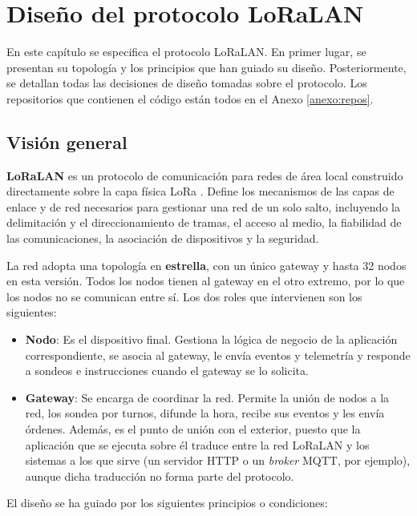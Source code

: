 \chapter{Diseño del protocolo LoRaLAN}\label{chap:4}

En este capítulo se especifica el protocolo LoRaLAN. En primer lugar, se presentan su topología y los principios que han guiado su diseño. Posteriormente, se detallan todas las decisiones de diseño tomadas sobre el protocolo. Los repositorios que contienen el código están todos en el Anexo \ref{anexo:repos}.


\section{Visión general}

\textbf{LoRaLAN} es un protocolo de comunicación para redes de área local construido directamente sobre la capa física LoRa \cite{semtech_sx1276}. Define los mecanismos de las capas de enlace y de red necesarios para gestionar una red de un solo salto, incluyendo la delimitación y el direccionamiento de tramas, el acceso al medio, la fiabilidad de las comunicaciones, la asociación de dispositivos y la seguridad.

La red adopta una topología en \textbf{estrella}, con un único gateway y hasta 32 nodos en esta versión. Todos los nodos tienen al gateway en el otro extremo, por lo que los nodos no se comunican entre sí. Los dos roles que intervienen son los siguientes:

\begin{itemize}
\item \textbf{Nodo}: Es el dispositivo final. Gestiona la lógica de negocio de la aplicación correspondiente, se asocia al gateway, le envía eventos y telemetría y responde a sondeos e instrucciones cuando el gateway se lo solicita.

\item \textbf{Gateway}: Se encarga de coordinar la red. Permite la unión de nodos a la red, los sondea por turnos, difunde la hora, recibe sus eventos y les envía órdenes. Además, es el punto de unión con el exterior, puesto que la aplicación que se ejecuta sobre él traduce entre la red LoRaLAN y los sistemas a los que sirve (un servidor HTTP o un \textit{broker} MQTT, por ejemplo), aunque dicha traducción no forma parte del protocolo.
\end{itemize}

El diseño se ha guiado por los siguientes principios o condiciones:

